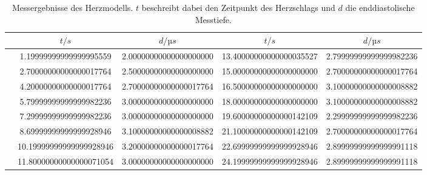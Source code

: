 \begin{table}
        \caption{Messergebnisse des Herzmodells. $t$ beschreibt dabei den Zeitpunkt des Herzschlags und $d$ die enddiastolische Messtiefe.}
        \centering
        \label{tab:tm}
        \begin{tabular}{l@{}S[table-format=2.1, round-precision=1, round-mode=places] S[table-format=1.1, round-precision=1, round-mode=places] |S[table-format=2.1, round-precision=1, round-mode=places] S[table-format=1.1, round-precision=1, round-mode=places] } \toprule & {$t/\si{s}$}& {$d/\si{µs}$}& {$t/\si{s}$}& {$d/\si{µs}$}\\\midrule& 1.19999999999999995559 & 2.00000000000000000000 & 13.40000000000000035527 & 2.79999999999999982236 \\
& 2.70000000000000017764 & 2.50000000000000000000 & 15.00000000000000000000 & 2.70000000000000017764 \\
& 4.20000000000000017764 & 2.70000000000000017764 & 16.50000000000000000000 & 3.10000000000000008882 \\
& 5.79999999999999982236 & 3.00000000000000000000 & 18.00000000000000000000 & 3.10000000000000008882 \\
& 7.29999999999999982236 & 3.00000000000000000000 & 19.60000000000000142109 & 2.29999999999999982236 \\
& 8.69999999999999928946 & 3.10000000000000008882 & 21.10000000000000142109 & 2.70000000000000017764 \\
& 10.19999999999999928946 & 3.20000000000000017764 & 22.69999999999999928946 & 2.89999999999999991118 \\
& 11.80000000000000071054 & 3.00000000000000000000 & 24.19999999999999928946 & 2.89999999999999991118 \\
 \bottomrule \end{tabular} \end{table}
